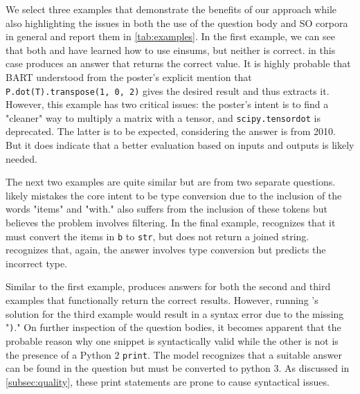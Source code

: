 \documentclass[11pt]{article}
\newcommand{\circleone}{\textrm{\ding{172}}}
\newcommand{\circletwo}{\textrm{\ding{173}}}
\newcommand{\circlethree}{\textrm{\ding{174}}}
\newcommand{\codesnip}[1]{\small\texttt{#1}\normalsize}
\begin{document}
We select three examples that demonstrate the benefits of our approach while also highlighting the issues in both the use of the question body and SO corpora in general and report them in \autoref{tab:examples}. In the first example, we can see that both \circleone\textrm{ }and \circletwo\textrm{ }have learned how to use einsums, but neither is correct. \circlethree\textrm{ }in this case produces an answer that returns the correct value. It is highly probable that BART understood from the poster's explicit mention that \codesnip{P.dot(T).transpose(1, 0, 2)} gives the desired result and thus extracts it. However, this example has two critical issues: the poster's intent is to find a "cleaner" way to multiply a matrix with a tensor, and \codesnip{scipy.tensordot} is deprecated. The latter is to be expected, considering the answer is from 2010. But it does indicate that a better evaluation based on inputs and outputs is likely needed.

\indent The next two examples are quite similar but are from two separate questions. \circleone\textrm{ }likely mistakes the core intent to be type conversion due to the inclusion of the words "items" and "with." \circletwo\textrm{ }also suffers from the inclusion of these tokens but believes the problem involves filtering. In the final example, \circleone\textrm{ }recognizes that it must convert the items in \codesnip{b} to \codesnip{str}, but does not return a joined string. \circletwo\textrm{ }recognizes that, again, the answer involves type conversion but predicts the incorrect type.

\indent Similar to the first example, \circlethree\textrm{ }produces answers for both the second and third examples that functionally return the correct results. However, running \circlethree's solution for the third example would result in a syntax error due to the missing "\codesnip{)}." On further inspection of the question bodies, it becomes apparent that the probable reason why one snippet is syntactically valid while the other is not is the presence of a Python 2 \codesnip{print}. The model recognizes that a suitable answer can be found in the question but must be converted to python 3. As discussed in \autoref{subsec:quality}, these print statements are prone to cause syntactical issues.   
\end{document}
